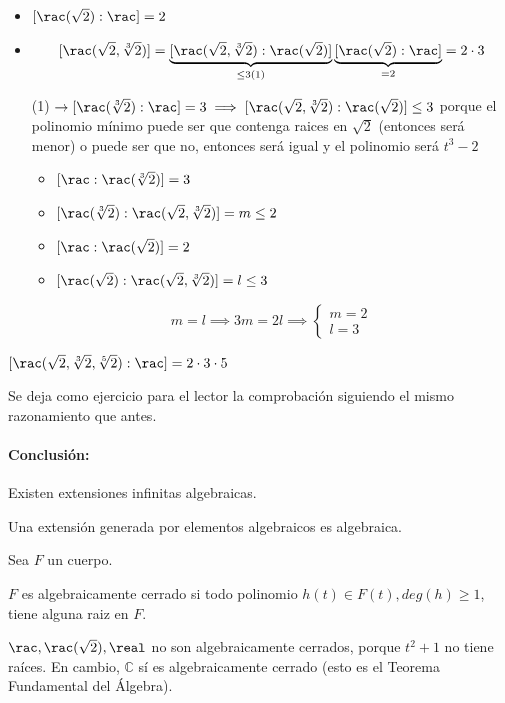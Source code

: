 \documentclass{apuntes}
\begin{document}
\begin{example}
\begin{itemize}
\item $[\rac(\sqrt{2}) : \rac] = 2$
\item \[[\rac(\sqrt{2},\sqrt[3]{2})] = \underbrace{[\rac(\sqrt{2},\sqrt[3]{2}):\rac(\sqrt{2})]}_{\leq 3 (1)} \underbrace{[\rac(\sqrt{2}):\rac]}_{= 2} = 2\cdot 3\]

(1) $\to [\rac(\sqrt[3]{2}): \rac] = 3 \implies  [\rac(\sqrt{2},\sqrt[3]{2}): \rac(\sqrt{2})] \leq 3$ porque el polinomio mínimo puede ser que contenga raices en $\sqrt{2}$ (entonces será menor) o puede ser que no, entonces será igual y el polinomio será $t^3-2$

\begin{itemize}
\item $[\rac : \rac(\sqrt[3]{2})] = 3$
\item $[\rac(\sqrt[3]{2}):\rac(\sqrt{2},\sqrt[3]{2})] = m \leq 2$
\item $[\rac : \rac(\sqrt{2})] = 2$
\item $[\rac(\sqrt{2}):\rac(\sqrt{2},\sqrt[3]{2})] = l \leq 3$
\end{itemize}
\[m=l \implies 3m=2l \implies\left\{ \begin{array}{cc}
m=2\\l=3\end{array}\right.\]
\end{itemize}
\end{example}

\begin{example}
$[\rac(\sqrt{2},\sqrt[3]{2},\sqrt[5]{2}):\rac] = 2\cdot 3\cdot5$

Se deja como ejercicio para el lector la comprobación siguiendo el mismo razonamiento que antes.

\end{example}

\paragraph{Conclusión:} Existen extensiones infinitas algebraicas.

\begin{corol}
Una extensión generada por elementos algebraicos es algebraica.
\end{corol}

\begin{defn}
Sea $F$ un cuerpo.

$F$ es algebraicamente cerrado si todo polinomio $h(t) \in F(t), deg(h) \geq 1$, tiene alguna raiz en $F$.
\end{defn}
\begin{example}
$\rac,\rac(\sqrt{2}),\real$ no son algebraicamente cerrados, porque $t^2+1$ no tiene raíces. En cambio, $\mathbb{C}$ sí es algebraicamente cerrado (esto es el Teorema Fundamental del Álgebra).
\end{example}
\end{document}
